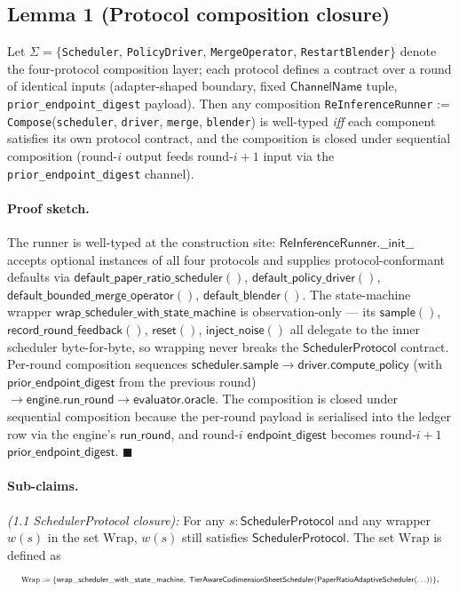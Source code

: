 \documentclass[journal,twocolumn,final]{IEEEtran}
\begin{document}
\subsection{Lemma 1 (Protocol composition closure)}

Let $\Sigma = \{$\texttt{Scheduler}, \texttt{PolicyDriver},
\texttt{MergeOperator}, \texttt{RestartBlender}$\}$ denote the four-protocol
composition layer; each protocol defines a contract over a round of identical
inputs (adapter-shaped boundary, fixed $\mathsf{ChannelName}$ tuple,
\texttt{prior\_endpoint\_digest} payload). Then any composition
\texttt{ReInferenceRunner} :=
\texttt{Compose}(\texttt{scheduler}, \texttt{driver},
\texttt{merge}, \texttt{blender}) is well-typed \emph{iff} each component
satisfies its own protocol contract, and the composition is closed under
sequential composition (round-$i$ output feeds round-$i+1$ input via the
\texttt{prior\_endpoint\_digest} channel).

\paragraph{Proof sketch.}
The runner is well-typed at the construction site:
$\mathsf{ReInferenceRunner.\_\_init\_\_}$ accepts optional instances of all
four protocols and supplies protocol-conformant defaults via
$\mathsf{default\_paper\_ratio\_scheduler()}$,
$\mathsf{default\_policy\_driver()}$,
$\mathsf{default\_bounded\_merge\_operator()}$,
$\mathsf{default\_blender()}$. The state-machine wrapper
$\mathsf{wrap\_scheduler\_with\_state\_machine}$ is observation-only --- its
$\mathsf{sample()}$, $\mathsf{record\_round\_feedback()}$, $\mathsf{reset()}$,
$\mathsf{inject\_noise()}$ all delegate to the inner scheduler byte-for-byte,
so wrapping never breaks the $\mathsf{SchedulerProtocol}$ contract. Per-round
composition sequences $\mathsf{scheduler.sample} \to
\mathsf{driver.compute\_policy}$ (with $\mathsf{prior\_endpoint\_digest}$ from
the previous round) $\to \mathsf{engine.run\_round} \to
\mathsf{evaluator.oracle}$. The composition is closed under sequential
composition because the per-round payload is serialised into the ledger row
via the engine's $\mathsf{run\_round}$, and round-$i$ $\mathsf{endpoint\_digest}$
becomes round-$i+1$ $\mathsf{prior\_endpoint\_digest}$. $\blacksquare$

\paragraph{Sub-claims.}
\emph{(1.1 SchedulerProtocol closure):} For any
$s\colon \mathsf{SchedulerProtocol}$ and any wrapper $w(s)$ in the set
$\mathrm{Wrap}$, $w(s)$ still satisfies $\mathsf{SchedulerProtocol}$.
The set $\mathrm{Wrap}$ is defined as
\begin{equation*}
\resizebox{0.97\columnwidth}{!}{$\mathrm{Wrap} :=
\{\mathsf{wrap\_scheduler\_with\_state\_machine},\;
\mathsf{TierAwareCodimensionSheetScheduler}(\mathsf{PaperRatioAdaptiveScheduler}(\ldots))\}$}.
\end{equation*}
\end{document}
